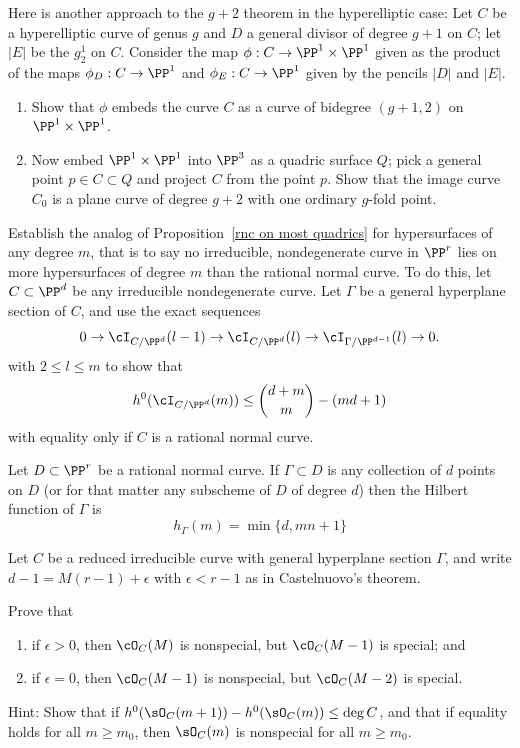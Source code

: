 \begin{exercise}
Here is another approach to the $g+2$ theorem in the hyperelliptic case: 
Let $C$ be a hyperelliptic curve of genus $g$ and $D$ a general divisor of degree $g+1$ on $C$; let $|E|$ be the $g^1_2$ on $C$.
Consider the map $\phi : C \to \PP^1 \times \PP^1$ given as the product of the maps $\phi_D : C \to \PP^1$ and $\phi_E : C \to \PP^1$ given by the pencils $|D|$ and $|E|$.
\begin{enumerate}
\item Show that $\phi$ embeds the curve $C$ as a curve of bidegree $(g+1,2)$ on $\PP^1 \times \PP^1$.
\item Now embed $\PP^1 \times \PP^1$ into $\PP^3$ as a quadric surface $Q$; pick a general point $p \in C \subset Q$ and project $C$ from the point $p$. Show that the image curve $C_0$ is a plane curve of degree $g+2$ with one ordinary $g$-fold point.
\end{enumerate}
\end{exercise}

\begin{exercise}\label{extremal m-ics}
Establish the analog of Proposition~\ref{rnc on most quadrics} for hypersurfaces of any degree $m$, that is to say no irreducible, nondegenerate curve in $\PP^r$ lies on more hypersurfaces of degree $m$ than the rational normal curve.
To do this, let $C\subset \PP^d$ be any irreducible nondegenerate curve. Let $\Gamma$ be a general hyperplane section
of $C$, and use the exact sequences
$$
0 \to \cI_{C/\PP^d}(l-1) \to \cI_{C/\PP^d}(l) \to \cI_{\Gamma/\PP^{d-1}}(l) \to 0.
$$ 
with $2 \leq l \leq m$ to show that
$$
h^0(\cI_{C/\PP^d}(m)) \leq  \binom{d+m}{m} - (md+1)
$$
with equality only if $C$ is a rational normal curve.
\end{exercise}

\begin{exercise}\label{linear bound is sharp}
Let $D \subset \PP^r$ be a rational normal curve. If $\Gamma \subset D$ is any collection of $d$ points on $D$ (or for that matter any subscheme of $D$ of degree $d$) then the Hilbert function of $\Gamma$ is
$$
h_\Gamma(m) = \min\{d, mn+1\}
$$
\end{exercise} 

\begin{exercise}
Let $C$ be a reduced irreducible curve with general hyperplane section $\Gamma$,
and write 
$d-1 = M(r-1) +\epsilon$ with $\epsilon<r-1$ as in Castelnuovo's theorem.
 
Prove that
\begin{enumerate}
\item if $\epsilon > 0$, then $\cO_C(M)$ is nonspecial, but $\cO_C(M-1)$ is special; and
\item if $\epsilon = 0$, then $\cO_C(M-1)$ is nonspecial, but $\cO_C(M-2)$ is special.
\end{enumerate}

Hint: Show that if $h^{0}(\sO_{C}(m+1))-h^{0}(\sO_{C}(m)) \leq \deg C$, and that if equality holds for
all $m\geq m_{0}$, then $\sO_{C}(m) $ is nonspecial for all $m\geq m_{0}$.

\end{exercise}


